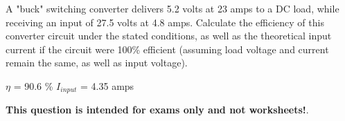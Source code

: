 

A "buck" switching converter delivers 5.2 volts at 23 amps to a DC load, while receiving an input of 27.5 volts at 4.8 amps.  Calculate the efficiency of this converter circuit under the stated conditions, as well as the theoretical input current if the circuit were 100\% efficient (assuming load voltage and current remain the same, as well as input voltage).  







$\eta$ = 90.6 \% \hskip 100pt $I_{input}$ = 4.35 amps







{\bf This question is intended for exams only and not worksheets!}.



